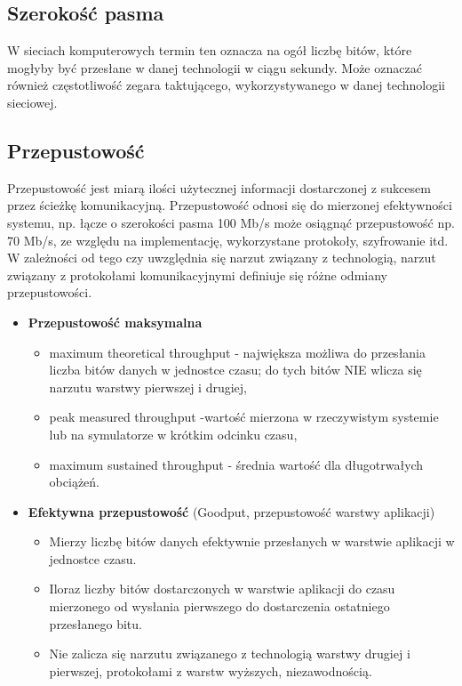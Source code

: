 \documentclass[../main.tex]{subfiles}
\begin{document}
    \subsection{Szerokość pasma}
    W sieciach komputerowych termin ten oznacza na ogół liczbę bitów, które mogłyby być
    przesłane w danej technologii w ciągu sekundy. Może oznaczać również częstotliwość zegara
    taktującego, wykorzystywanego w danej technologii sieciowej.

    \subsection{Przepustowość}
    Przepustowość jest miarą ilości użytecznej informacji dostarczonej z sukcesem przez ścieżkę
    komunikacyjną. Przepustowość odnosi się do mierzonej efektywności systemu, np. łącze o
    szerokości pasma 100 Mb/s może osiągnąć przepustowość np. 70 Mb/s, ze względu na
    implementację, wykorzystane protokoły, szyfrowanie itd.\\

    W zależności od tego czy uwzględnia się narzut związany z technologią, narzut związany z protokołami komunikacyjnymi definiuje się różne odmiany przepustowości.
    \begin{itemize}
        \item \textbf{Przepustowość maksymalna}
        \begin{itemize}
            \item maximum theoretical throughput - największa możliwa do przesłania liczba bitów danych w jednostce czasu; do tych bitów NIE wlicza się narzutu warstwy pierwszej i drugiej,
            \item peak measured throughput -wartość mierzona w rzeczywistym systemie lub na symulatorze w krótkim odcinku czasu,
            \item maximum sustained throughput - średnia wartość dla długotrwałych obciążeń.
        \end{itemize}
        \item \textbf{Efektywna przepustowość} (Goodput, przepustowość warstwy aplikacji)\\
        \begin{itemize}
            \item Mierzy liczbę bitów danych efektywnie przesłanych w warstwie aplikacji w jednostce czasu.
            \item Iloraz liczby bitów dostarczonych w warstwie aplikacji do czasu mierzonego od wysłania pierwszego do dostarczenia ostatniego przesłanego bitu.
            \item Nie zalicza się narzutu związanego z technologią warstwy drugiej i pierwszej, protokołami z warstw wyższych, niezawodnością.
        \end{itemize}
    \end{itemize}
\end{document}
